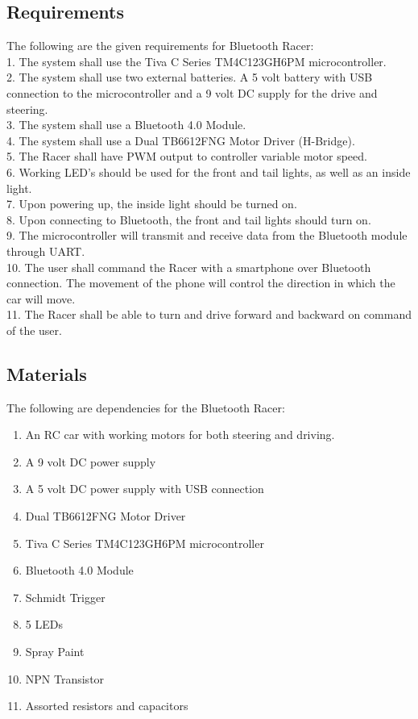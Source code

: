 \documentclass[12pt]{article}
\begin{document}
\subsection{Requirements}
The following are the given requirements for Bluetooth Racer:\\
1. The system shall use the Tiva C Series TM4C123GH6PM microcontroller.\\
2. The system shall use two external batteries. A 5 volt battery with USB connection to the microcontroller and a 9 volt DC supply for the drive and steering.\\
3. The system shall use a Bluetooth 4.0 Module.\\
4. The system shall use a Dual TB6612FNG Motor Driver (H-Bridge).\\
5. The Racer shall have PWM output to controller variable motor speed.\\
6. Working LED’s should be used for the front and tail lights, as well as an inside light.\\
7. Upon powering up, the inside light should be turned on. \\
8. Upon connecting to Bluetooth, the front and tail lights should turn on. \\
9. The microcontroller will transmit and receive data from the Bluetooth module through UART.\\
10. The user shall command the Racer with a smartphone over Bluetooth connection. The movement of the phone will control the direction in which the car will move.\\
11. The Racer shall be able to turn and drive forward and backward on command of the user.\\


\subsection{Materials}
The following are dependencies for the Bluetooth Racer:\\
\begin{enumerate}
\item An RC car with working motors for both steering and driving.
\item A 9 volt DC power supply
\item A 5 volt DC power supply with USB connection
\item Dual TB6612FNG Motor Driver
\item Tiva C Series TM4C123GH6PM microcontroller
\item Bluetooth 4.0 Module
\item Schmidt Trigger
\item 5 LEDs
\item Spray Paint
\item NPN Transistor
\item Assorted resistors and capacitors
\end{enumerate}
\end{document}
